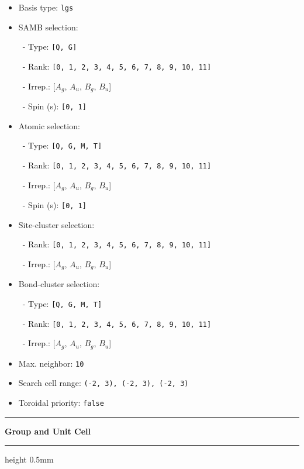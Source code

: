 \documentclass[fleqn,10pt,landscape]{jsarticle}
\begin{document}
\begin{itemize}
\item Basis type: \texttt{lgs}

\item SAMB selection:

\, - Type: \texttt{[Q, G]}

\, - Rank: \texttt{[0, 1, 2, 3, 4, 5, 6, 7, 8, 9, 10, 11]}

\, - Irrep.: [$A_{g}$, $A_{u}$, $B_{g}$, $B_{u}$]

\, - Spin (s): \texttt{[0, 1]}

\item Atomic selection:

\, - Type: \texttt{[Q, G, M, T]}

\, - Rank: \texttt{[0, 1, 2, 3, 4, 5, 6, 7, 8, 9, 10, 11]}

\, - Irrep.: [$A_{g}$, $A_{u}$, $B_{g}$, $B_{u}$]

\, - Spin (s): \texttt{[0, 1]}

\item Site-cluster selection:

\, - Rank: \texttt{[0, 1, 2, 3, 4, 5, 6, 7, 8, 9, 10, 11]}

\, - Irrep.: [$A_{g}$, $A_{u}$, $B_{g}$, $B_{u}$]

\item Bond-cluster selection:

\, - Type: \texttt{[Q, G, M, T]}

\, - Rank: \texttt{[0, 1, 2, 3, 4, 5, 6, 7, 8, 9, 10, 11]}

\, - Irrep.: [$A_{g}$, $A_{u}$, $B_{g}$, $B_{u}$]

\item Max. neighbor: \texttt{10}

\item Search cell range: \texttt{(-2, 3), (-2, 3), (-2, 3)}

\item Toroidal priority: \texttt{false}

\end{itemize}
\vspace{5mm}
\noindent \rule[0.5mm]{5mm}{0.5mm}\hspace{3mm}\textbf{Group and Unit Cell}\hspace{3mm}\leaders\hrule height 0.5mm\hfill\kern0pt
\vspace{3mm}
\end{document}
